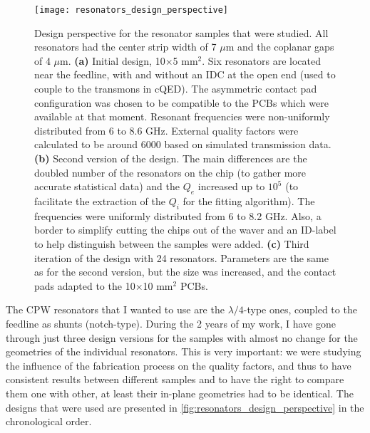 \begin{figure}[t]
\texttt{[image: resonators\_design\_perspective]}
\caption{Design perspective for the resonator samples that were studied. All resonators had the center strip width of 7 $\mu$m and the coplanar gaps of 4 $\mu$m. \textbf{(a)} Initial design, 10$\times$5 mm$^2$. Six resonators are located near the feedline, with and without an IDC at the open end (used to couple to the transmons in cQED). The asymmetric contact pad configuration was chosen to be compatible to the PCBs which were available at that moment. Resonant frequencies were non-uniformly distributed from 6 to 8.6 GHz. External quality factors were calculated to be around 6000 based on simulated transmission data. \textbf{(b)} Second version of the design. The main differences are the doubled number of the resonators on the chip (to gather more accurate statistical data) and the $Q_e$ increased up to $10^{5}$ (to facilitate the extraction of the $Q_i$ for the fitting algorithm). The frequencies were uniformly distributed from 6 to 8.2 GHz. Also, a border to simplify cutting the chips out of the waver and an ID-label to help distinguish between the samples were added. \textbf{(c)} Third iteration of the design with 24 resonators. Parameters are the same as for the second version, but the size was increased, and the contact pads adapted to the 10$\times$10 mm$^2$ PCBs.}
\label{fig:resonators_design_perspective}
\end{figure}

The CPW resonators that I wanted to use are the $\lambda/4$-type ones, coupled to the feedline as shunts (notch-type). During the 2 years of my work, I have gone through just three design versions for the samples with almost no change for the geometries of the individual resonators. This is very important: we were studying the influence of the fabrication process on the quality factors, and thus to have consistent results between different samples and to have the right to compare them one with other, at least their in-plane geometries had to be identical. The designs that were used are presented in \autoref{fig:resonators_design_perspective} in the chronological order. 

